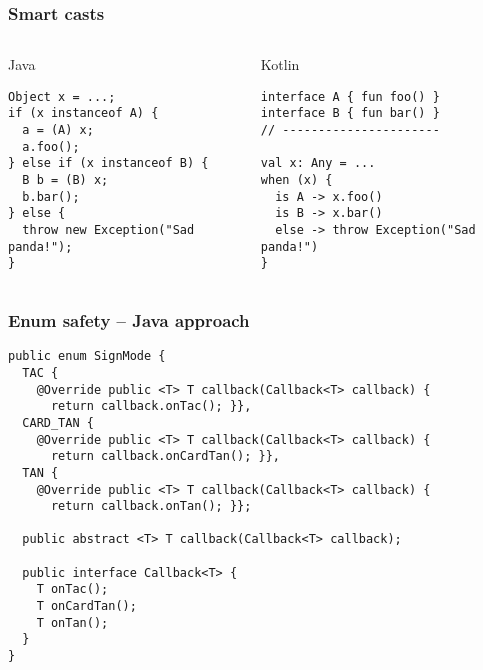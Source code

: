 

\begin{frame}[fragile]
\frametitle{Smart casts}
\begin{columns}[t]
\begin{column}{0.5\textwidth}
\begin{center}
  Java
\end{center}
\begin{lstlisting}[style=twosided]
Object x = ...;
if (x instanceof A) {
  a = (A) x;
  a.foo();
} else if (x instanceof B) {
  B b = (B) x;
  b.bar();
} else {
  throw new Exception("Sad panda!");
}
\end{lstlisting}

\end{column}
\begin{column}{0.5\textwidth}
\begin{center}
  Kotlin
\end{center}
\begin{lstlisting}[style=twosided]
interface A { fun foo() }
interface B { fun bar() }
// ----------------------

val x: Any = ...
when (x) {
  is A -> x.foo()
  is B -> x.bar()
  else -> throw Exception("Sad panda!")
}
\end{lstlisting}
\end{column}
\end{columns}
\end{frame}


\begin{frame}[fragile] \frametitle{Enum safety -- Java approach}
\begin{lstlisting}[basicstyle=\color{IJ_text}\ttfamily\tiny]
public enum SignMode {
  TAC {
    @Override public <T> T callback(Callback<T> callback) {
      return callback.onTac(); }},
  CARD_TAN {
    @Override public <T> T callback(Callback<T> callback) {
      return callback.onCardTan(); }},
  TAN {
    @Override public <T> T callback(Callback<T> callback) {
      return callback.onTan(); }};

  public abstract <T> T callback(Callback<T> callback);

  public interface Callback<T> {
    T onTac();
    T onCardTan();
    T onTan();
  }
}

\end{lstlisting}
\end{frame}

